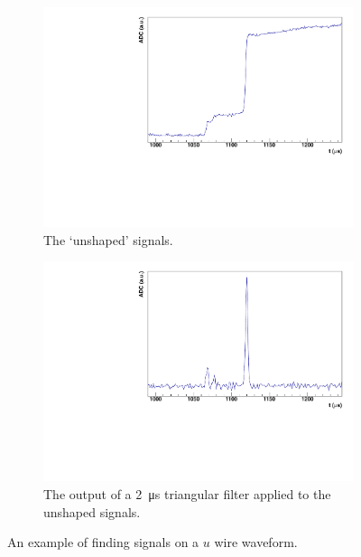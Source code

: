 \documentclass[herrin-thesis.tex]{subfiles}
\begin{document}
\begin{figure}
\begin{subfigure}[t]{0.48\textwidth}
		\centering
		\includegraphics[width=\textwidth]{./plots/data_signal_finding_unshaped.pdf}
		\caption[Unshaped signals]{The `unshaped' signals.}
		\label{fig:data_signal_finding_unshaped}
	\end{subfigure}\hfill%
	\begin{subfigure}[t]{0.48\textwidth}
		\centering
		\includegraphics[width=\textwidth]{./plots/data_signal_finding_msf.pdf}
		\caption[Multiple signal finger output]{The output of a \SI{2}{\micro\s} triangular filter applied to the unshaped signals.}
		\label{fig:data_signal_finding_msf}
	\end{subfigure}
	\caption[The signal-finding process]{An example of finding signals on a \(u\) wire waveform.}
	\label{fig:data_signal_finding}
\end{figure}
\end{document}
